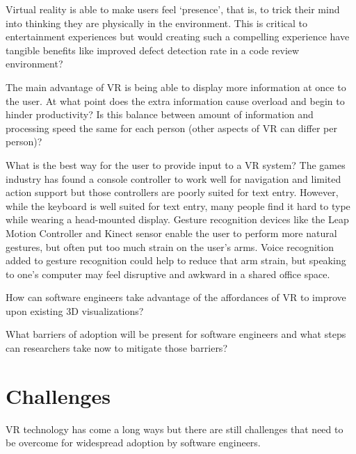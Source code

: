 \documentclass[conference]{IEEEtran}
\begin{document}
Virtual reality is able to make users feel `presence', that is, to trick their mind into thinking they are physically in the environment. 
This is critical to entertainment experiences but would creating such a compelling experience have tangible benefits like improved defect detection rate in a code review environment? 

The main advantage of VR is being able to display more information at once to the user.  
At what point does the extra information cause overload and begin to hinder productivity?  
Is this balance between amount of information and processing speed the same for each person (other aspects of VR can differ per person)?


What is the best way for the user to provide input to a VR system? 
The games industry has found a console controller to work well for navigation and limited action support but those controllers are poorly suited for text entry. 
However, while the keyboard is well suited for text entry, many people find it hard to type while wearing a head-mounted display. 
Gesture recognition devices like the Leap Motion Controller and Kinect sensor enable the user to perform more natural gestures, but often put too much strain on the user's arms. 
Voice recognition added to gesture recognition could help to reduce that arm strain, but speaking to one's computer may feel disruptive and awkward in a shared office space.

How can software engineers take advantage of the affordances of VR to improve upon existing 3D visualizations?

What barriers of adoption will be present for software engineers and what steps can researchers take now to mitigate those barriers?

\section{Challenges}
VR technology has come a long ways but there are still challenges that need to be overcome for widespread adoption by software engineers.
\end{document}
